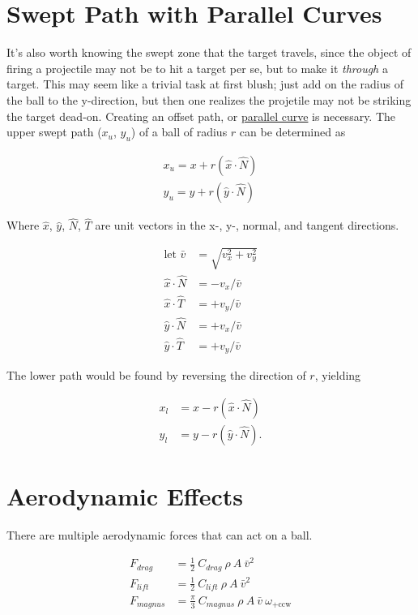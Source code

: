 \documentclass[10pt,letterpaper]{article}
\begin{document}
\section{Swept Path with Parallel Curves}
	It's also worth knowing the swept zone that the target travels, since the object of firing a projectile may not be to hit a target per se, but to make it \textit{through} a target. This may seem like a trivial task at first blush; just add on the radius of the ball to the y-direction, but then one realizes the projetile may not be striking the target dead-on. Creating an offset path, or \href{https://en.wikipedia.org/wiki/Parallel_curve}{parallel curve} is necessary. The upper swept path ($x_u$, $y_u$) of a ball of radius $r$ can be determined as

	\begin{align}
		x_u = x + r (\hat{x} \cdot \hat{N}) \\
		y_u = y + r (\hat{y} \cdot \hat{N})
	\end{align}

	Where $\hat{x}$, $\hat{y}$, $\hat{N}$, $\hat{T}$ are unit vectors in the x-, y-, normal, and tangent directions.

	\begin{align}
		\text{let } \bar{v} &= \sqrt{v_x^2 + v_y^2} \\
		\hat{x} \cdot \hat{N} &= - v_x / \bar{v} \\
		\hat{x} \cdot \hat{T} &= + v_y / \bar{v} \\
		\hat{y} \cdot \hat{N} &= + v_x / \bar{v} \\
		\hat{y} \cdot \hat{T} &= + v_y / \bar{v}
	\end{align}

	The lower path would be found by reversing the direction of $r$, yielding
	
	\begin{align}
		x_l &= x - r (\hat{x} \cdot \hat{N}) \\
		y_l &= y - r (\hat{y} \cdot \hat{N}) .
	\end{align}

\section{Aerodynamic Effects}
	There are multiple aerodynamic forces that can act on a ball.

	\begin{align}
		F_{drag}   &= \frac{1}{2}   \ C_{drag} \ \rho \ A \ \bar{v}^2 \\
		F_{lift}   &= \frac{1}{2}   \ C_{lift} \ \rho \ A \ \bar{v}^2 \\
		F_{magnus} &= \frac{\pi}{3} \ C_{magnus} \ \rho \ A \ \bar{v} \ \omega_{\text{+ccw}}
	\end{align}	
\end{document}
